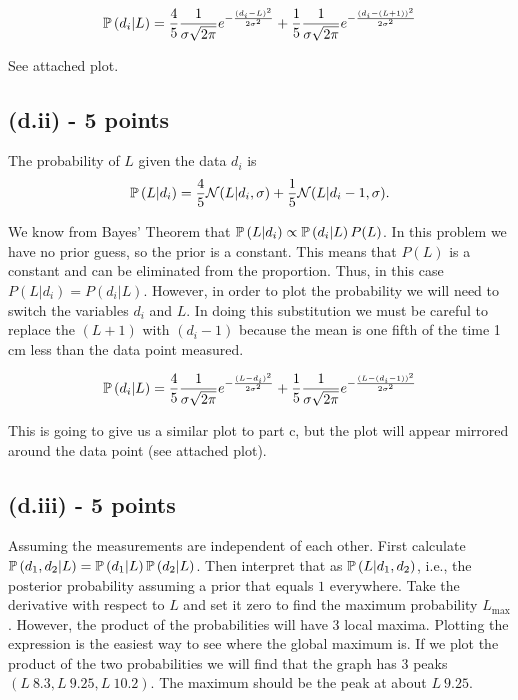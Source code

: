 \documentclass[11pt]{article}
\begin{document}
\begin{eqnarray*}
\mathbb{P}\left(d_i|L\right) = \frac{4}{5}\frac{1}{\sigma\sqrt{2\pi}} e^{-\frac{(d_i-L)^2}{2\sigma^2}} + \frac{1}{5}\frac{1}{\sigma\sqrt{2\pi}} e^{-\frac{(d_i-(L+1))^2}{2\sigma^2}}
\end{eqnarray*}

See attached plot.

\subsection*{(d.ii) - 5 points}
The probability of $L$ given the data $d_i$ is
\begin{equation}
\mathbb{P}\left(L|d_i\right) = \frac{4}{5}\mathcal{N}(L|d_i,\sigma) + \frac{1}{5}\mathcal{N}(L|d_i-1,\sigma).
\end{equation}

We know from Bayes' Theorem that $\mathbb{P}\left(L|d_i\right) \propto \mathbb{P}\left(d_i|L\right) P(L)$.  In this problem we have no prior guess, so the prior is a constant.  This means that $P(L)$ is a constant and can be eliminated from the proportion.  Thus, in this case $P(L|d_i) = P(d_i|L)$.  However, in order to plot the probability we will need to switch the variables $d_i$ and $L$.  In doing this substitution we must be careful to replace the $(L+1)$ with $(d_i-1)$ because the mean is one fifth of the time 1 cm less than the data point measured.  

\begin{eqnarray*}
\mathbb{P}\left(d_i|L\right) = \frac{4}{5}\frac{1}{\sigma\sqrt{2\pi}} e^{-\frac{(L-d_i)^2}{2\sigma^2}} + \frac{1}{5}\frac{1}{\sigma\sqrt{2\pi}} e^{-\frac{(L-(d_i-1))^2}{2\sigma^2}}
\end{eqnarray*}

This is going to give us a similar plot to part c, but the plot will appear mirrored around the data point (see attached plot).

\subsection*{(d.iii) - 5 points}


Assuming the measurements are independent of each other. First calculate $\mathbb{P}\left(d_1,d_2|L\right) = \mathbb{P}\left(d_1|L\right)\mathbb{P}\left(d_2|L\right)$. Then interpret that as $\mathbb{P}\left(L|d_1,d_2\right)$, i.e., the posterior probability assuming a prior that equals $1$ everywhere. Take the derivative with respect to $L$ and set it zero to find the maximum probability $L_\text{max}$.  However, the product of the probabilities will have 3 local maxima.  Plotting the expression is the easiest way to see where the global maximum is.  If we plot the product of the two probabilities we will find that the graph has 3 peaks $(L~8.3,L~9.25,L~10.2)$.  The maximum should be the peak at about $L~9.25$.
\end{document}
